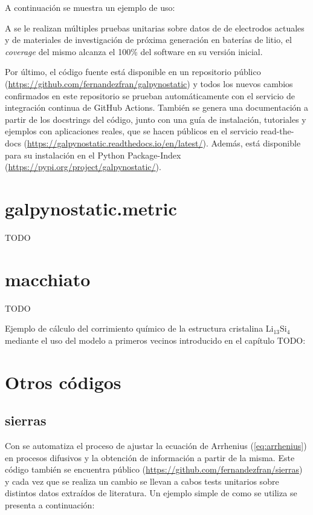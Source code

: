 A continuación se muestra un ejemplo de uso:



A  se le realizan múltiples pruebas unitarias sobre datos de
de electrodos actuales y de materiales de investigación de próxima generación en 
baterías de litio, el \textit{coverage} del mismo alcanza el 100\% del software
en su versión inicial.

Por último, el código fuente está disponible en un repositorio público 
(\url{https://github.com/fernandezfran/galpynostatic}) y todos los nuevos cambios 
confirmados en este repositorio se prueban automáticamente con el servicio de 
integración continua de GitHub Actions. También se genera una documentación a 
partir de los docstrings del código, junto con una guía de instalación,
tutoriales y ejemplos con aplicaciones reales, que se hacen públicos en el 
servicio read-the-docs (\url{https://galpynostatic.readthedocs.io/en/latest/}). 
Además,  está disponible para su instalación en el Python 
Package-Index (\url{https://pypi.org/project/galpynostatic/}).


\section{galpynostatic.metric}

TODO


\section{macchiato}

TODO

Ejemplo de cálculo del corrimiento químico de la estructura cristalina 
Li$_{13}$Si$_{4}$ mediante el uso del modelo a primeros vecinos introducido en 
el capítulo TODO:



\section{Otros códigos}

\subsection{sierras}
Con  se automatiza el proceso de ajustar la ecuación de Arrhenius 
(\ref{eq:arrhenius}) en procesos difusivos y la obtención de información a partir 
de la misma. Este código también se encuentra público 
(\url{https://github.com/fernandezfran/sierras}) y cada vez que se realiza un 
cambio se llevan a cabos tests unitarios sobre distintos datos extraídos de 
literatura. Un ejemplo simple de como se utiliza se presenta a continuación:

